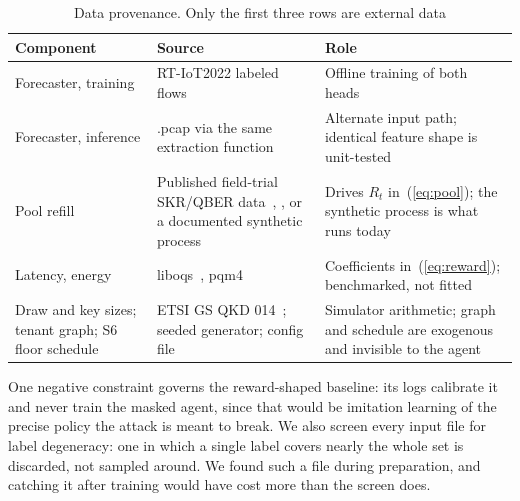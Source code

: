 \documentclass[conference]{IEEEtran}
\begin{document}
\begin{table}[t]
\caption{Data provenance. Only the first three rows are external data}
\label{tab:provenance}
\centering
\begin{tabular}{@{}L{3.6cm}L{6.5cm}L{6.5cm}@{}}
\toprule
Component & Source & Role \\
\midrule
Forecaster, training & RT-IoT2022 labeled flows~\cite{ref25} & Offline training of both heads \\
Forecaster, inference & .pcap via the same extraction function & Alternate input path; identical feature shape is unit-tested \\
Pool refill & Published field-trial SKR/QBER data~\cite{ref4}, \cite{ref26}, or a documented synthetic process & Drives $R_t$ in~(\ref{eq:pool}); the synthetic process is what runs today \\
Latency, energy & liboqs~\cite{ref22}, pqm4~\cite{ref23} & Coefficients in~(\ref{eq:reward}); benchmarked, not fitted \\
Draw and key sizes; tenant graph; S6 floor schedule & ETSI GS QKD 014~\cite{ref6}; seeded generator; config file & Simulator arithmetic; graph and schedule are exogenous and invisible to the agent \\
\bottomrule
\end{tabular}
\end{table}

One negative constraint governs the reward-shaped baseline:
its logs calibrate it and never train the masked agent, since that
would be imitation learning of the precise policy the attack
is meant to break. We also screen every input file for label
degeneracy: one in which a single label covers nearly the
whole set is discarded, not sampled around. We found such
a file during preparation, and catching it after training would
have cost more than the screen does.
\end{document}
